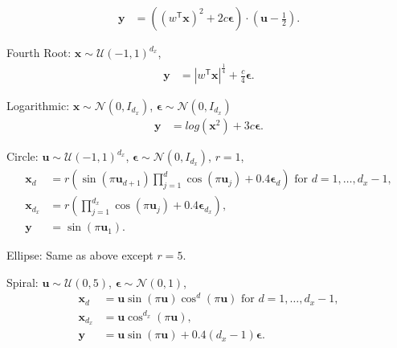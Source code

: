 \documentclass[11pt]{article}
\newcommand{\T}{^{\ensuremath{\mathsf{T}}}}           %
\providecommand{\mb}[1]{\boldsymbol{#1}}
\providecommand{\mc}[1]{\mathcal{#1}}
\begin{document}
\begin{compactenum}
\begin{align*}
\mb{y}&=( (w\T \mb{x})^2  + 2c\mb{\epsilon}) \cdot (\mb{u}-\frac{1}{2}).
\end{align*}
\item Fourth Root: $\mb{x} \sim \mc{U}(-1,1)^{d_{x}}$,
\begin{align*}
\mb{y}&=|w\T \mb{x}|^\frac{1}{4}+\frac{c}{4}\mb{\epsilon}.
\end{align*}
\item Logarithmic: $\mb{x} \sim \mc{N}(0, I_{d_{x}})$, $\mb{\epsilon} \sim \mc{N}(0, I_{d_{x}})$
\begin{align*}
\mb{y}&=log(\mb{x}^2)+3c\mb{\epsilon}.
\end{align*}
\item Circle: $\mb{u} \sim \mc{U}(-1,1)^{d_{x}}$, $\mb{\epsilon} \sim \mc{N}(0, I_{d_{x}})$, $r=1$,
\begin{align*}
\mb{x}_{d}&=r (\sin(\pi \mb{u}_{d+1})  \prod_{j=1}^{d} \cos(\pi \mb{u}_{j})+0.4 \mb{\epsilon}_{d}) \mbox{ for $d=1,\ldots,d_{x}-1$},\\
\mb{x}_{d_{x}}&=r (\prod_{j=1}^{d_{x}} \cos(\pi \mb{u}_{j})+0.4 \mb{\epsilon}_{d_{x}}),\\
\mb{y}&= \sin(\pi \mb{u}_{1}).
\end{align*}
\item Ellipse: Same as above except $r=5$.

\item Spiral: $\mb{u} \sim \mc{U}(0,5)$, $\mb{\epsilon} \sim \mc{N}(0, 1)$, 
\begin{align*}
\mb{x}_{d}&=\mb{u} \sin(\pi \mb{u})  \cos^{d}(\pi \mb{u}) \mbox{ for $d=1,\ldots,d_{x}-1$},\\
\mb{x}_{d_{x}}&=\mb{u} \cos^{d_{x}}(\pi \mb{u}),\\
\mb{y}&= \mb{u} \sin(\pi \mb{u}) +0.4 (d_{x}-1)\mb{\epsilon}.
\end{align*}


\end{compactenum}
\end{document}
